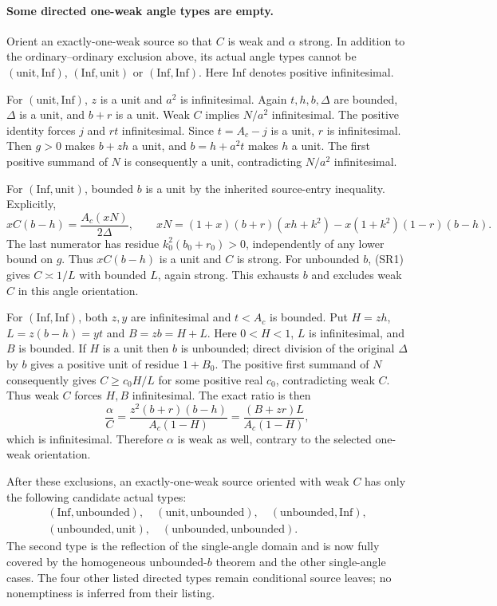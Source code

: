 \paragraph{Some directed one-weak angle types are empty.}
Orient an exactly-one-weak source so that $C$ is weak and $\alpha$
strong. In addition to the ordinary--ordinary exclusion above, its
actual angle types cannot be $(\mathrm{unit},\mathrm{Inf})$,
$(\mathrm{Inf},\mathrm{unit})$ or $(\mathrm{Inf},\mathrm{Inf})$.
Here $\mathrm{Inf}$ denotes positive infinitesimal.

For $(\mathrm{unit},\mathrm{Inf})$, $z$ is a unit and $a^2$ is
infinitesimal. Again $t,h,b,\Delta$ are bounded, $\Delta$ is a unit,
and $b+r$ is a unit. Weak $C$ implies $N/a^2$ infinitesimal.
The positive identity forces $j$ and $rt$ infinitesimal. Since
$t=A_c-j$ is a unit, $r$ is infinitesimal. Then $g>0$ makes
$b+zh$ a unit, and $b=h+a^2t$ makes $h$ a unit. The first positive
summand of $N$ is consequently a unit, contradicting $N/a^2$
infinitesimal.

For $(\mathrm{Inf},\mathrm{unit})$, bounded $b$ is a unit by the
inherited source-entry inequality. Explicitly,
\[
 xC(b-h)=\frac{A_c(xN)}{2\Delta},\qquad
 xN=(1+x)(b+r)(xh+k^2)-x(1+k^2)(1-r)(b-h).
\]
The last numerator has residue $k_0^2(b_0+r_0)>0$, independently
of any lower bound on $g$. Thus $xC(b-h)$ is a unit and $C$ is strong. For unbounded
$b$, (SR1) gives $C\asymp1/L$ with bounded $L$, again strong.
This exhausts $b$ and excludes weak $C$ in this angle orientation.

For $(\mathrm{Inf},\mathrm{Inf})$, both $z,y$ are infinitesimal
and $t<A_c$ is bounded. Put $H=zh$, $L=z(b-h)=yt$ and $B=zb=H+L$.
Here $0<H<1$, $L$ is infinitesimal, and $B$ is bounded. If $H$ is
a unit then $b$ is unbounded; direct division of the original
$\Delta$ by $b$ gives a positive unit of residue $1+B_0$.
The positive first summand of $N$ consequently gives
$C\ge c_0H/L$ for some positive real $c_0$, contradicting weak $C$.
Thus weak $C$ forces $H,B$ infinitesimal. The exact ratio is then
\[
 \frac\alpha C=
 \frac{z^2(b+r)(b-h)}{A_c(1-H)}
 =\frac{(B+zr)L}{A_c(1-H)},
\]
which is infinitesimal. Therefore $\alpha$ is weak as well, contrary
to the selected one-weak orientation.

After these exclusions, an exactly-one-weak source oriented with weak
$C$ has only the following candidate actual types:
\begin{gather*}
 (\mathrm{Inf},\mathrm{unbounded}),\quad
 (\mathrm{unit},\mathrm{unbounded}),\quad
 (\mathrm{unbounded},\mathrm{Inf}),\\
 (\mathrm{unbounded},\mathrm{unit}),\quad
 (\mathrm{unbounded},\mathrm{unbounded}).
\end{gather*}
The second type is the reflection of the single-angle domain and
is now fully covered by the homogeneous unbounded-$b$ theorem and the
other single-angle cases. The four other listed directed types
remain conditional source leaves; no nonemptiness is inferred from
their listing.

